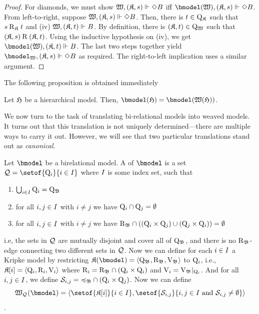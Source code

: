 \begin{proof}
    \medskip
    \noindent
    For diamonds, we must show ${\mathfrak{W},(\mathfrak{K},s)}\Vdash{\Diamond} B$ iff $\xforces {\bmofwm} {\pair{\kmodel}{s}} \Diamond B$.
    From left-to-right, suppose ${\mathfrak{W},(\mathfrak{K},s)}\Vdash{\Diamond} B$.
    Then, there is $t \in \mathrm{Q}_{\mathfrak{K}_{}}$ such that $s \mathbin{\mathrm{R}_{\mathfrak{K}_{}}} t$ and (iv) ${\mathfrak{W},(\mathfrak{K},t)}\Vdash{B}$.
    By definition, there is ${(\mathfrak{K},t)} \in \mathrm{Q}_{\mathfrak{W}_{}}$ such that ${(\mathfrak{K},s)} \mathbin{\mathrm{R}} {(\mathfrak{K},t)}$.
    Using the inductive hypothesis on (iv), we get $\xforces {\bmofwm} {\pair{\kmodel}{t}} B$.
    The last two steps together yield $\bmodel_{\wmodel}, (\kmodel, s) \Vdash \Diamond B$ as required.
    The right-to-left implication uses a similar argument.
\end{proof}


The following proposition is obtained immediately

\begin{proposition}
    Let $\mathfrak{H}$ be a hierarchical model. Then, $\bmofhm = \bmodel(\wmofhm)$.
\end{proposition}

We now turn to the task of translating bi-relational models into weaved models. It turns out that this translation is not uniquely determined---there are multiple ways to carry it out. However, we will see that two particular translations stand out as \emph{canonical}.

\begin{construction}\label{con:bks2ws}
Let $\bmodel$ be a birelational model. A  of $\bmodel$ is a set $\QQs=\setof{\Qof i}{i\in\Ind}$ where $I$ is some index set, such that
\begin{enumerate}
\item $\bigcup_{i\in I}\mathrm{Q}_{i} = \mathrm{Q}_{\mathfrak{B}_{}}$
\item for all $i,j\in I$ with $i\neq j$ we have $\mathrm{Q}_{i} \cap \mathrm{Q}_{j}=\emptyset$ 
\item for all $i,j\in I$ with $i\neq j$ we have
    $\mathbin{\mathrm{R}_{\mathfrak{B}_{}}}\cap((\mathrm{Q}_{i} \times \mathrm{Q}_{j})\cup(\mathrm{Q}_{j} \times \mathrm{Q}_{i}))=\emptyset$ 
\end{enumerate}
i.e, the sets in $\mathcal{Q}_{}$ are mutually disjoint and cover all of $\mathrm{Q}_{\mathfrak{B}_{}}$,    and there is no $\mathbin{\mathrm{R}_{\mathfrak{B}_{}}}$-edge connecting two different sets in $\mathcal{Q}_{}$. Now we can define for each $i\in I$ a Kripke model by restricting $\kmofbm=\tuple{\Qbm,\Rbm,\Vbm}$ to $\mathrm{Q}_{i}$, i.e.,
$\mathfrak{K}[i]= \langle\mathrm{Q}_{i}, \mathbin{\mathrm{R}_{i}}, \mathrm{V}_{i}\rangle$ where $\mathbin{\mathrm{R}_{i}}=\mathbin{\mathrm{R}_{\mathfrak{B}_{}}}\cap(\mathrm{Q}_{i} \times \mathrm{Q}_{i})$ and $\mathrm{V}_{i}= \mathrm{V}_{\mathfrak{B}_{}}\vert_{\mathrm{Q}_{i}}$.
And for all $i,j\in I$, we define $\mathcal{S}_{i,j}={\preccurlyeq_{\mathfrak{B}}}\cap(\mathrm{Q}_{i} \times \mathrm{Q}_{j})$.
    Now we can define $$\wmofbm\QQs = \tuple{\setof{\kmodel[i]}{i\in\Ind},\setof{\Sof {i,j}}{i,j\in\Ind \mbox{ and } \Sof {i,j}\neq\emptyset}}$$.
    \end{construction}

